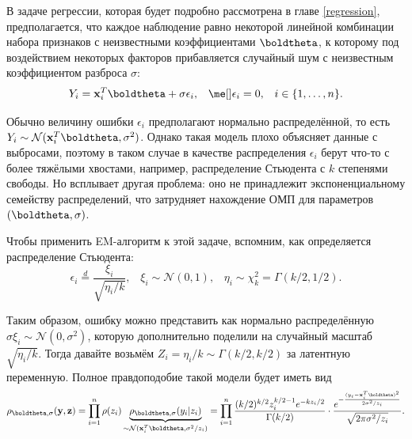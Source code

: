 \begin{example}
	В задаче регрессии, которая будет подробно рассмотрена в главе \ref{regression}, предполагается, что каждое наблюдение равно некоторой линейной комбинации набора признаков с неизвестными коэффициентами $\boldtheta$, к которому под воздействием некоторых факторов прибавляется случайный шум с неизвестным коэффициентом разброса $\sigma$:
	\[
	Y_i = \mathbf x_i^T \boldtheta + \sigma\epsilon_i, \;\;\; \me[]\epsilon_i = 0, \;\;\; i \in \{1, \ldots, n\}.
	\]
	
	Обычно величину ошибки $\epsilon_i$ предполагают нормально распределённой, то есть $Y_i \sim \mathcal{N}(\mathbf x_i^T \boldtheta, \sigma^2)$. Однако такая модель плохо объясняет данные с выбросами, поэтому в таком случае в качестве распределения $\epsilon_i$ берут что-то с более тяжёлыми хвостами, например, распределение Стьюдента с $k$ степенями свободы. Но всплывает другая проблема: оно не принадлежит экспоненциальному семейству распределений, что затрудняет нахождение ОМП для параметров $(\boldtheta, \sigma)$. 
	
	Чтобы применить EM-алгоритм к этой задаче, вспомним, как определяется распределение Стьюдента:
	\[
	\epsilon_i \stackrel{d}{=} \frac{\xi_i}{\sqrt{\eta_i / k}}, \;\;\; \xi_i \sim \mathcal{N}(0, 1), \;\;\;\eta_i \sim \chi^2_k = \Gamma(k/2, 1/2).
	\]
	
	Таким образом, ошибку можно представить как нормально распределённую $\sigma \xi_i \sim \mathcal{N}(0, \sigma^2)$, которую дополнительно поделили на случайный масштаб $\sqrt{\eta_i / k}$. Тогда давайте возьмём $Z_i = \eta_i / k \sim \Gamma(k/2, k/2)$ за латентную переменную. Полное правдоподобие такой модели будет иметь вид
	\[
	\rho_{\boldtheta, \sigma}(\mathbf y, \mathbf z) = \prod_{i=1}^n \rho(z_i) \underbrace{\rho_{\boldtheta, \sigma}(y_i | z_i)}_{\sim \mathcal{N}(\mathbf{x}_i^T \boldtheta, \sigma^2/z_i)} =  \prod_{i=1}^n \frac{(k/2)^{k/2} z_i^{k/2-1} e^{-kz_i/2}}{\Gamma(k/2)} \cdot \frac{e^{-\frac{(y_i-\mathbf{x}_i^T \boldtheta)^2}{2\sigma^2/z_i}}}{\sqrt{2\pi \sigma^2 / z_i}}.
	\]
	

\end{example}

